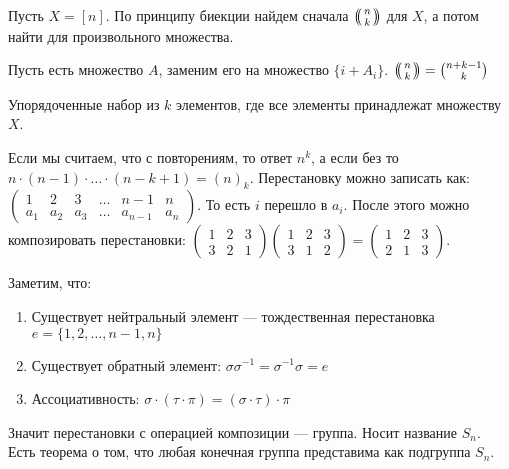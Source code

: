 Пусть $X = [n]$. По принципу биекции найдем сначала $\multiset{n}{k}$ для  $X$, а потом найти для произвольного множества. 

Пусть есть множество  $A$, заменим его на множество  $\{ i + A_i\}$. $\multiset{n}{k} = \binom{n+k-1}{k}$

\begin{definition}
    Упорядоченные набор из $k$ элементов, где все элементы принадлежат множеству  $X$.
\end{definition}
Если мы считаем, что с повторениям, то ответ $n^k$, а если без то  $n \cdot (n-1) \cdot \ldots \cdot (n-k+1) = (n)_k$. Перестановку можно записать как: $\begin{pmatrix} 1 & 2 & 3 & \ldots & n-1 & n \\ a_1 & a_2 & a_3 & \ldots & a_{n-1} & a_n\end{pmatrix}$. То есть $i$ перешло в  $a_i$. После этого можно композировать перестановки:  $\begin{pmatrix} 1 & 2 & 3 \\ 3 & 2 & 1 \end{pmatrix} \begin{pmatrix} 1 & 2 & 3 \\ 3 & 1 & 2 \end{pmatrix} = \begin{pmatrix} 1 & 2 & 3 \\ 2 & 1 & 3 \end{pmatrix}$.

Заметим, что: 
\begin{enumerate}
    \item Существует нейтральный элемент --- тождественная перестановка $e = \{1,2,\ldots,n-1,n\}$
    \item Существует обратный элемент: $\sigma \sigma^{-1} = \sigma^{-1} \sigma = e$
    \item Ассоциативность: $\sigma \cdot (\tau \cdot \pi) = (\sigma \cdot \tau) \cdot \pi$
\end{enumerate}
\slashn
Значит перестановки с операцией композиции --- группа. Носит название $S_n$. Есть теорема о том, что любая конечная группа представима как подгруппа $S_n$.  

